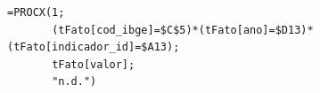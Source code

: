\begin{verbatim}
=PROCX(1;
       (tFato[cod_ibge]=$C$5)*(tFato[ano]=$D13)*(tFato[indicador_id]=$A13);
       tFato[valor];
       "n.d.")
\end{verbatim}
